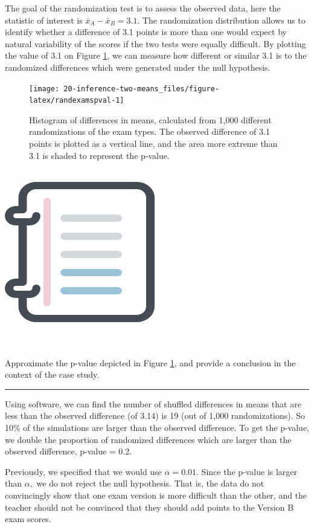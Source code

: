 \documentclass[
  10pt,
  openany]{book}
\newenvironment{mdframedwithfootGPWE}
{   
    \savenotes
    \begin{mdframed}[%
    topline=true, bottomline=true, linecolor=oiB, linewidth=0.5pt,
    rightline=false, leftline=false,
    backgroundcolor=oiLGray]
    \renewcommand{\thempfootnote}{\arabic{footnote}}
    }
{
    \end{mdframed}
    \spewnotes
}
\newenvironment{workedexample}{
    \let\oldrule\rule
    \renewcommand{\rule}[2]{\vspace{-2mm}\oldrule{##1}{##2}\vspace{-2mm}}
\vspace{4mm}
\begin{mdframedwithfootGPWE}
\begin{minipage}[t]{0.10\textwidth}
{$\:$ \\ \setkeys{Gin}{width=2.5em,keepaspectratio}\includegraphics{images/_icons/worked-example.png}}
\end{minipage}
\hfill
\begin{minipage}[t]{0.90\textwidth}
\vspace{-2mm}
\setlength{\parskip}{1em}
\noindent\textbf{\color{oiB}\small\fontfamily{phv}\selectfont{\MakeUppercase{Example}}} $\:$ \\ \\
}{\end{minipage}
\end{mdframedwithfootGPWE}
\vspace{4mm}
}
\begin{document}
The goal of the randomization test is to assess the observed data, here the statistic of interest is \(\bar{x}_A - \bar{x}_B=3.1.\) The randomization distribution allows us to identify whether a difference of 3.1 points is more than one would expect by natural variability of the scores if the two tests were equally difficult.
By plotting the value of 3.1 on Figure \ref{fig:randexamspval}, we can measure how different or similar 3.1 is to the randomized differences which were generated under the null hypothesis.

\begin{figure}[h]

{\centering \texttt{[image: 20-inference-two-means\_files/figure-latex/randexamspval-1]} 

}

\caption{Histogram of differences in means, calculated from 1,000 different randomizations of the exam types.  The observed difference of 3.1 points is plotted as a vertical line, and the area more extreme than 3.1 is shaded to represent the p-value.}\label{fig:randexamspval}
\end{figure}

\begin{workedexample}
Approximate the p-value depicted in Figure \ref{fig:randexamspval}, and provide a conclusion in the context of the case study.

\begin{center}\rule{0.5\linewidth}{0.5pt}\end{center}

Using software, we can find the number of shuffled differences in means that are less than the observed difference (of 3.14) is 19 (out of 1,000 randomizations).
So 10\% of the simulations are larger than the observed difference.
To get the p-value, we double the proportion of randomized differences which are larger than the observed difference, p-value = 0.2.

Previously, we specified that we would use \(\alpha = 0.01.\) Since the p-value is larger than \(\alpha,\) we do not reject the null hypothesis.
That is, the data do not convincingly show that one exam version is more difficult than the other, and the teacher should not be convinced that they should add points to the Version B exam scores.

\end{workedexample}
\end{document}
